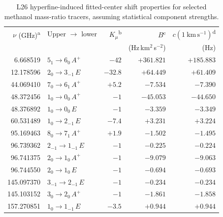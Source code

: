 \begin{table}[!htbp]
\caption{L26 hyperfine-induced fitted-center shift properties for
selected methanol mass-ratio tracers, assuming statistical
component strengths. %
}
\label{tab:mu-tracers-one-kms}
\centering
\begingroup
\footnotesize
\setlength{\tabcolsep}{2pt}
\renewcommand{\arraystretch}{1.12}
\begin{ruledtabular}
\begin{tabular}{rlrrr}
$\nu$ (GHz)\textsuperscript{a} & Upper $\to$ lower & $K_\mu$\textsuperscript{b} & $B$\textsuperscript{c} & $c(1~\mathrm{km\,s^{-1}})$\textsuperscript{d} \\
 & & & (Hz\,km$^2$\,s$^{-2}$) & (Hz) \\
\hline
6.668519 & $5_{1}\to 6_{0}\,A^+$ & $-42$ & $+361.821$ & $+185.883$ \\
12.178596 & $2_{0}\to 3_{-1}\,E$ & $-32.8$ & $+64.449$ & $+61.409$ \\
44.069410 & $7_{0}\to 6_{1}\,A^+$ & $+5.2$ & $-7.534$ & $-7.390$ \\
48.372456 & $1_{0}\to 0_{0}\,A^+$ & $-1$ & $-45.053$ & $-44.650$ \\
48.376892 & $1_{0}\to 0_{0}\,E$ & $-1$ & $-3.359$ & $-3.349$ \\
60.531489 & $1_{0}\to 2_{-1}\,E$ & $-7.4$ & $+3.231$ & $+3.224$ \\
95.169463 & $8_{0}\to 7_{1}\,A^+$ & $+1.9$ & $-1.502$ & $-1.495$ \\
96.739362 & $2_{-1}\to 1_{-1}\,E$ & $-1$ & $-0.225$ & $-0.224$ \\
96.741375 & $2_{0}\to 1_{0}\,A^+$ & $-1$ & $-9.079$ & $-9.063$ \\
96.744550 & $2_{0}\to 1_{0}\,E$ & $-1$ & $-0.694$ & $-0.693$ \\
145.097370 & $3_{-1}\to 2_{-1}\,E$ & $-1$ & $-0.234$ & $-0.234$ \\
145.103152 & $3_{0}\to 2_{0}\,A^+$ & $-1$ & $-1.861$ & $-1.858$ \\
157.270851 & $1_{0}\to 1_{-1}\,E$ & $-3.5$ & $+0.944$ & $+0.944$ \\
\end{tabular}
\end{ruledtabular}
\endgroup
\par\vspace{3pt}
\begin{minipage}{\linewidth}

\end{minipage}
\end{table}
